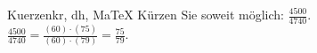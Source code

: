 \begin{MAufgabe}{Kuerzen}{kr, dh, MaTeX}
K\"urzen Sie soweit m\"oglich: $\frac{4500}{4740}$.\\ 
\ifLsg\MLoesung
\quad $\frac{4500}{4740}=\frac{(60)\cdot(75)}{(60)\cdot(79)}=\frac{75}{79}$.\else\relax\fi
 \end{MAufgabe}